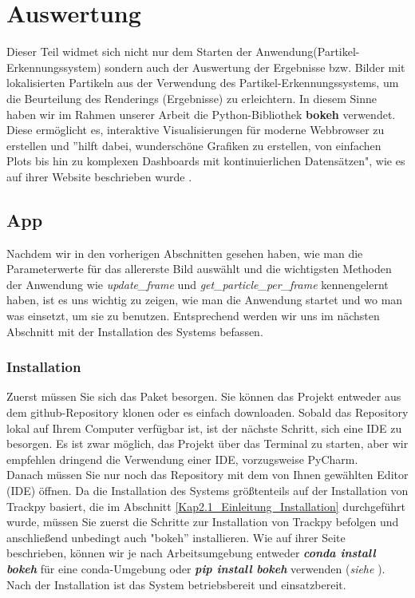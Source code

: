 \chapter{Auswertung \label{kap6}}
Dieser Teil widmet sich nicht nur dem Starten der Anwendung(Partikel-Erkennungssystem) sondern auch der Auswertung der Ergebnisse bzw. Bilder mit lokalisierten Partikeln aus der Verwendung des Partikel-Erkennungssystems, um die Beurteilung des Renderings (Ergebnisse) zu erleichtern.
In diesem Sinne haben wir im Rahmen unserer Arbeit die Python-Bibliothek \textbf{bokeh} verwendet. Diese ermöglicht es, interaktive Visualisierungen für moderne Webbrowser zu erstellen und ''hilft dabei, wunderschöne Grafiken zu erstellen, von einfachen Plots bis hin zu komplexen Dashboards mit kontinuierlichen Datensätzen", wie es auf ihrer Website beschrieben wurde \cite{bokeh}.

\section{App}
Nachdem wir in den vorherigen Abschnitten gesehen haben, wie man die Parameterwerte für das allererste Bild auswählt und die wichtigsten Methoden der Anwendung wie \textit{update\_frame} und \textit{get\_particle\_per\_frame} kennengelernt haben, ist es uns wichtig zu zeigen, wie man die Anwendung startet und wo man was einsetzt, um sie zu benutzen.
Entsprechend werden wir uns im nächsten Abschnitt mit der Installation des Systems befassen.

\subsection{Installation}
Zuerst müssen Sie sich das Paket besorgen. Sie können das Projekt entweder aus dem github-Repository \cite{particleTrackingSystem} klonen oder es einfach downloaden. Sobald das Repository lokal auf Ihrem Computer verfügbar ist, ist der nächste Schritt, sich eine IDE zu besorgen. Es ist zwar möglich, das Projekt über das Terminal zu starten, aber wir empfehlen dringend die Verwendung einer IDE, vorzugsweise PyCharm.\\
Danach müssen Sie nur noch das Repository mit dem von Ihnen gewählten Editor (IDE) öffnen.  
Da die Installation des Systems größtenteils auf der Installation von Trackpy basiert, die im Abschnitt  \ref{Kap2.1_Einleitung_Installation} durchgeführt wurde, müssen Sie zuerst die Schritte zur Installation von Trackpy befolgen und anschließend unbedingt auch "bokeh'' installieren.   
Wie auf ihrer Seite beschrieben, können wir je nach Arbeitsumgebung entweder \textsl{\textbf{conda install bokeh}} für eine conda-Umgebung oder \textsl{\textbf{pip install bokeh}} verwenden (\textit{siehe} \cite{bokeh}).
Nach der Installation ist das System betriebsbereit und einsatzbereit.

